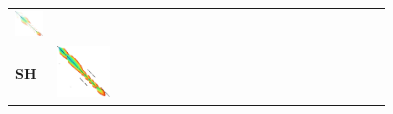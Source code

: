 \begin{figure}[t]
\begin{tabular}{l>{\centering}m{0.18\linewidth}>{\centering}m{0.18\linewidth}>{\centering}m{0.18\linewidth}>{\centering\arraybackslash}m{0.35\linewidth}}
    \includegraphics[scale=0.15]{imgs/comparison/dijkstra-noprune-dt.png} &
    \\[1cm]
    \textbf{SH} &
    \includegraphics[scale=0.15]{imgs/comparison/sh-noprune.png} &

\end{tabular}
\end{figure}
